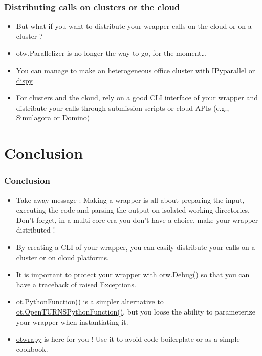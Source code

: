 \documentclass[10pt, aspectratio=169]{beamer}
\begin{document}
\begin{frame}
\frametitle{Distributing calls on clusters or the cloud}
\begin{itemize}
\item But what if you want to distribute your wrapper calls on the cloud or
  on a cluster ?
\item otw.Parallelizer is no longer the way to go, for the moment\ldots{}
\item You can manage to make an heterogeneous office cluster with \href{http://ipyparallel.readthedocs.io/en/latest/}{IPyparallel} or \href{http://dispy.sourceforge.net/}{dispy}
\item For clusters and the cloud, rely on a good CLI interface of your
  wrapper and distribute your calls through submission scripts or
  cloud APIs (e.g., \href{https://www.simulagora.com/}{Simulagora} or \href{https://www.dominodatalab.com/}{Domino})
\end{itemize}
\end{frame}


\section{Conclusion}
\label{sec-8}
\begin{frame}
\frametitle{Conclusion}
\begin{itemize}
\item Take away message : Making a wrapper is all about preparing the
  input, executing the code and parsing the output on isolated working
  directories. Don't forget, in a multi-core era you don't have a
  choice, make your wrapper distributed !
\item By creating a CLI of your wrapper, you can easily distribute your
  calls on a cluster or on cloud platforms.
\item It is important to protect your wrapper with otw.Debug() so that
  you can have a traceback of raised Exceptions.
\item \href{http://doc.openturns.org/openturns-latest/sphinx/user_manual/_generated/openturns.PythonFunction.html}{ot.PythonFunction()} is a simpler alternative to
  \href{http://doc.openturns.org/openturns-latest/sphinx/user_manual/_generated/openturns.OpenTURNSPythonFunction.html}{ot.OpenTURNSPythonFunction()}, but you loose the ability to parameterize your wrapper when instantiating it.
\item \href{http://openturns.github.io/otwrapy/master/index.html}{otwrapy} is here for you ! Use it to avoid code boilerplate or as a simple cookbook.
\end{itemize}
\end{frame}
\end{document}
